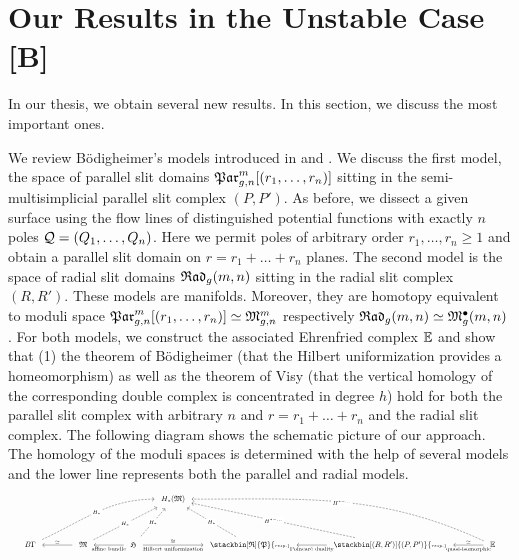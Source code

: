 \section{Our Results in the Unstable Case [B]}
In our thesis, we obtain several new results.
In this section, we discuss the most important ones.

We review Bödigheimer's models introduced in \cite{Boedigheimer19901} and \cite{Boedigheimer2006}.
We discuss the first model, the space of parallel slit domains $\Parr$ sitting in the semi-multisimplicial parallel slit complex $(P,P')$.
As before, we dissect a given surface using the flow lines of distinguished potential functions with exactly $n$ poles $\mc Q = (Q_1, \ldots, Q_n)$.
Here we permit poles of arbitrary order $r_1, \ldots, r_n \ge 1$ and obtain a parallel slit domain on $r = r_1 + \ldots + r_n$ planes.
The second model is the space of radial slit domains ${\mathfrak{Rad}_g(m,n)}$ sitting in the radial slit complex $(R,R')$.
These models are manifolds.
Moreover, they are homotopy equivalent to moduli space $\Parr \simeq \Modspc$ respectively ${\mathfrak{Rad}_g(m,n)} \simeq \mathfrak{M}^\bullet_g(m, n)$.
For both models, we construct the associated Ehrenfried complex $\mathbb E$ and show that 
(1) the theorem of Bödigheimer (that the Hilbert uniformization provides a homeomorphism)
as well as the theorem of Visy (that the vertical homology of the corresponding double complex is concentrated in degree $h$) hold for both
the parallel slit complex with arbitrary $n$ and $r = r_1 + \ldots + r_n$ and the radial slit complex.
The following diagram shows the schematic picture of our approach.
The homology of the moduli spaces is determined with the help of several models and the lower line represents both the parallel and radial models.
\[
    \resizebox{\linewidth}{!}{
        \begin{tikzcd}[row sep=10ex, scale=1.3, ampersand replacement=\&]
            \&\&\&\&\&H_\ast(\mathfrak M) \\
            B\Gamma \arrow[<-, shorten <=1ex, shorten >=1ex]{rr}{\simeq} \arrow[dashed, out=25, in=180, shorten <=1ex, shorten >=1ex]{rrrrru}[description]{H_\ast} \&\&
            \mathfrak M \arrow[<-, shorten <=1ex, shorten >=1ex]{rr}[swap]{\text{affine bundle}} \arrow[dashed, shorten <=1ex, shorten >=1ex]{rrru}[description]{H_\ast} \&\&
            \mathfrak H \arrow[shorten <=1ex, shorten >=1ex]{rr}{\cong}[swap]{\text{Hilbert uniformization}} \arrow[dashed, shorten <=1ex, shorten >=1ex]{ru}[description]{H_\ast} \&\&
            \stackbin[\mathfrak R]{\mathfrak P}{\scriptscriptstyle{resp.}} \arrow[<-, shorten <=1ex, shorten >=1ex]{rr}[swap]{\text{Poincaré duality}} \arrow[dashed, shorten <=1ex, shorten >=1ex]{lu}[description]{H_\ast} \&\&
            \stackbin[(R,R')]{(P,P')}{\scriptscriptstyle{resp.}} \arrow[<-, shorten <=1ex, shorten >=1ex]{rr}{\simeq}[swap]{\text{quasi-isomorphic}} \arrow[dashed, shorten <=1ex, shorten >=1ex]{lllu}[description]{H^{\ast-\ldots}} \&\&
            \E \arrow[dashed, out=155, in=0, shorten <=1ex, shorten >=1ex]{lllllu}[description]{H^{\ast-\ldots}}
        \end{tikzcd}
    }
\]

